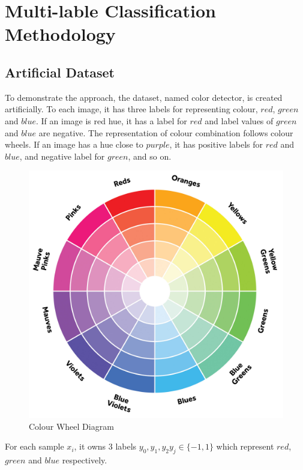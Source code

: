 
\chapter{Multi-lable Classification Methodology} %
\label{Chapter6}

\section{Artificial Dataset}

To demonstrate the approach, the dataset, named color detector, is created artificially. To each image, it has three labels for representing colour, $red$, $green$ and $blue$. If an image is red hue, it has a label for $red$ and label values of $green$ and $blue$ are negative. The representation of colour combination follows colour wheels. If an image has a hue close to $purple$, it has positive labels for $red$ and $blue$, and negative label for $green$, and so on.
\graphicspath{ {./Figures/} }
\begin{figure}[!htb]
\centering
\includegraphics[scale=0.1]{color_wheel.jpg}
\caption{\label{fig:perceptron}Colour Wheel Diagram}
\end{figure}

For each sample $x_{i}$, it owns 3 labels ${y_{0},y_{1},y_{2}} y_{j} \in \{-1,1\}$ which represent $red$, $green$ and $blue$ respectively.

